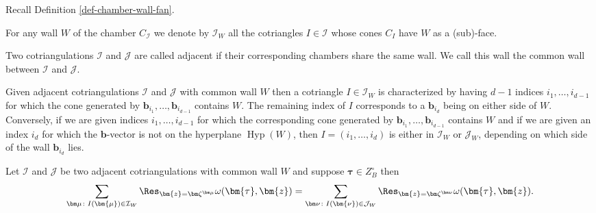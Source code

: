 Recall Definition \ref{def-chamber-wall-fan}.
\begin{Definition}
For any wall $W$ of the chamber $C_{\mathcal{I}}$ we denote by $\mathcal{I}_W$ all the cotriangles $I \in \mathcal{I}$ whose cones $C_I$ have $W$ as a (sub)-face.
\end{Definition}

\begin{Definition}
Two cotriangulations $\mathcal{I}$ and $\mathcal{J}$ are called adjacent if their corresponding chambers share the same wall. We call this wall the common wall between $\mathcal{I}$ and $\mathcal{J}$.
\end{Definition}

Given adjacent cotriangulations $\mathcal{I}$ and $\mathcal{J}$ with common wall $W$ then a cotriangle $I \in \mathcal{I}_W$ is characterized by having $d-1$ indices $i_1,\dots,i_{d-1}$ for which the cone generated by $\bm{b}_{i_1},\dots,\bm{b}_{i_{d-1}}$ contains $W$. The remaining index of $I$ corresponds to a $\bm{b}_{i_d}$ being on either side of $W$. Conversely, if we are given indices $i_1,\dots,i_{d-1}$
for which the corresponding cone generated by $\bm{b}_{i_1},\dots,\bm{b}_{i_{d-1}}$ contains
$W$ and if we are given an index $i_d$ for which the $\bm{b}$-vector is not on the hyperplane
$\operatorname{Hyp}(W)$, then $I = (i_1,\dots,i_{d})$ is either in $\mathcal{I}_W$ or
$\mathcal{J}_W$, depending on which side of the wall $\bm{b}_{i_d}$ lies.


\begin{Proposition}\label{lem-edge-res}
Let $\mathcal{I}$ and $\mathcal{J}$ be two adjacent cotriangulations with common wall $W$ and suppose $\bm\tau \in Z_B^\circ$ then
\begin{gather*}
\sum_{\bm\mu\colon I(\bm{\mu})\in\mathcal{I}_W}\Res_{\bm{z}=\bm\zeta^{\bm\mu}}\omega(\bm{\tau},\bm{z})
=\sum_{\bm\nu\colon I(\bm{\nu})\in\mathcal{J}_W}\Res_{\bm{z}=\bm\zeta^{\bm\nu}}\omega(\bm{\tau},\bm{z}).
\end{gather*}
\end{Proposition}

